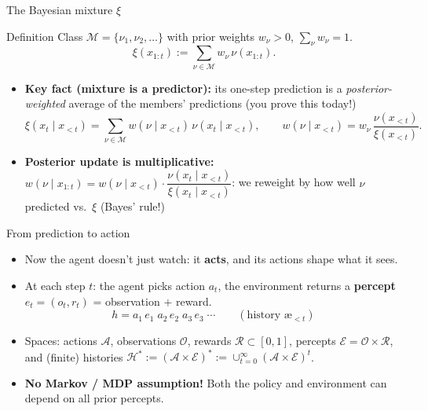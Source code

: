 \documentclass[10pt,aspectratio=169]{beamer}
\newcommand{\cA}{\mathcal{A}}
\newcommand{\cO}{\mathcal{O}}
\newcommand{\cR}{\mathcal{R}}
\newcommand{\cE}{\mathcal{E}}
\newcommand{\cH}{\mathcal{H}}
\newcommand{\cM}{\mathcal{M}}
\newcommand{\aes}{{\text{\ae}}}            %
\begin{document}
\begin{frame}{The Bayesian mixture $\xi$}
\begin{block}{Definition}
Class $\cM=\{\nu_1,\nu_2,\dots\}$ with prior weights $w_\nu>0$, $\sum_\nu w_\nu = 1$.
\[
\xi(x_{1:t}) := \sum_{\nu \in \cM} w_\nu\, \nu(x_{1:t}).
\]
\end{block}
\pause
\begin{itemize}
    \item \textbf{Key fact (mixture is a predictor):} its one-step prediction is a
    \emph{posterior-weighted} average of the members' predictions (you prove this today!)
    \[
    \xi(x_t \mid x_{<t}) = \sum_{\nu \in \cM} w(\nu \mid x_{<t})\, \nu(x_t \mid x_{<t}),
    \qquad
    w(\nu \mid x_{<t}) = w_\nu\,\frac{\nu(x_{<t})}{\xi(x_{<t})}.
    \]
    \pause
    \item \textbf{Posterior update is multiplicative:}
    $w(\nu \mid x_{1:t}) = w(\nu\mid x_{<t})\cdot \dfrac{\nu(x_t\mid x_{<t})}{\xi(x_t\mid x_{<t})}$: we
    reweight by how well $\nu$ predicted vs.\ $\xi$ (Bayes' rule!)
\end{itemize}
\end{frame}



\begin{frame}{From prediction to action}
\begin{itemize}
    \item Now the agent doesn't just watch: it \textbf{acts}, and its actions shape what it sees.
    \pause
    \item At each step $t$: the agent picks action $a_t$, the environment returns a
    \textbf{percept} $e_t=(o_t,r_t)$ = observation $+$ reward.
    \[
    h = a_1\, e_1 \; a_2\, e_2 \; a_3\, e_3 \;\cdots \qquad
    (\text{history } \aes_{<t})
    \]
    \pause
    \item Spaces: actions $\cA$, observations $\cO$, rewards $\cR \subset [0,1]$, percepts $\cE=\cO\times\cR$,
    and (finite) histories $\cH^* := (\cA \times \cE)^* := \cup_{t=0}^\infty (\cA \times \cE)^t$.
    \pause
    \item \textbf{No Markov / MDP assumption!} Both the policy and environment can depend on all prior percepts.
\end{itemize}
\end{frame}
\end{document}

